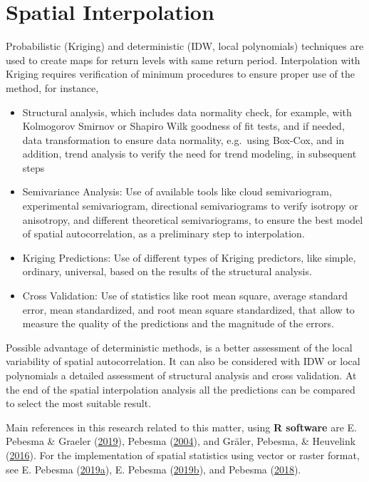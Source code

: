 \documentclass[12pt,oneside]{reedthesis}
\begin{document}
\hypertarget{si}{%
\section{Spatial Interpolation}\label{si}}

Probabilistic (Kriging) and deterministic (IDW, local polynomials) techniques are used to create maps for return levels with same return period. Interpolation with Kriging requires verification of minimum procedures to ensure proper use of the method, for instance,
\begin{itemize}
\item
  Structural analysis, which includes data normality check, for example, with Kolmogorov Smirnov or Shapiro Wilk goodness of fit tests, and if needed, data transformation to ensure data normality, e.g.~using Box-Cox, and in addition, trend analysis to verify the need for trend modeling, in subsequent steps
\item
  Semivariance Analysis: Use of available tools like cloud semivariogram, experimental semivariogram, directional semivariograms to verify isotropy or anisotropy, and different theoretical semivariograms, to ensure the best model of spatial autocorrelation, as a preliminary step to interpolation.
\item
  Kriging Predictions: Use of different types of Kriging predictors, like simple, ordinary, universal, based on the results of the structural analysis.
\item
  Cross Validation: Use of statistics like root mean square, average standard error, mean standardized, and root mean square standardized, that allow to measure the quality of the predictions and the magnitude of the errors.
\end{itemize}
Possible advantage of deterministic methods, is a better assessment of the local variability of spatial autocorrelation. It can also be considered with IDW or local polynomials a detailed assessment of structural analysis and cross validation. At the end of the spatial interpolation analysis all the predictions can be compared to select the most suitable result.

Main references in this research related to this matter, using \textbf{R software} are E. Pebesma \& Graeler (\protect\hyperlink{ref-Pebesma2019}{2019}), Pebesma (\protect\hyperlink{ref-Pebesma2004}{2004}), and Gräler, Pebesma, \& Heuvelink (\protect\hyperlink{ref-Graeler2016}{2016}). For the implementation of spatial statistics using vector or raster format, see E. Pebesma (\protect\hyperlink{ref-Pebesma2019a}{2019}\protect\hyperlink{ref-Pebesma2019a}{a}), E. Pebesma (\protect\hyperlink{ref-Pebesma2019b}{2019}\protect\hyperlink{ref-Pebesma2019b}{b}), and Pebesma (\protect\hyperlink{ref-Pebesma2018}{2018}).
\end{document}
